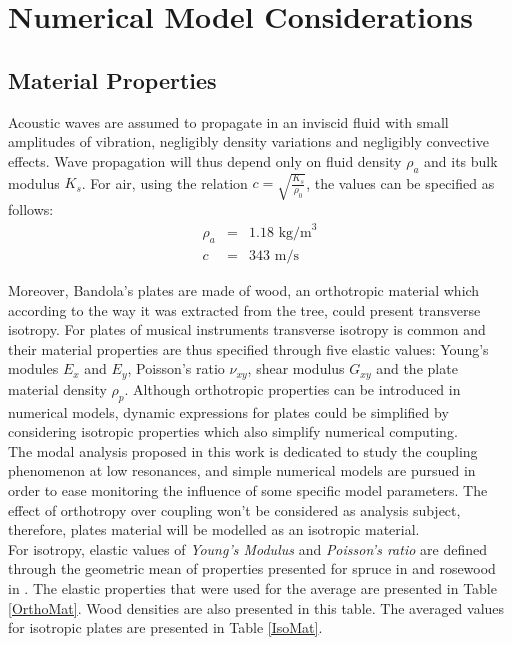 \section{Numerical Model Considerations}

\subsection{Material Properties}

Acoustic waves are assumed to propagate in an inviscid fluid with small amplitudes of vibration, negligibly density variations and negligibly convective effects. Wave propagation will thus depend only on fluid density $\rho_a$ and its bulk modulus $K_s$. For air, using the relation $c= \sqrt{\frac{K_s}{\rho_0}}$, the values can be specified as follows:
\begin{eqnarray*}
\rho_a & = & 1.18 \text{ kg/m}^3\\
c & = & 343 \text{ m/s} 
\end{eqnarray*}

Moreover, Bandola's plates are made of wood, an orthotropic material which according to the way it was extracted from the tree, could present transverse isotropy. For plates of musical instruments transverse isotropy is common and their material properties are thus specified through five elastic values: Young's modules $E_x$ and $E_y$, Poisson's ratio $\nu_{xy}$, shear modulus $G_{xy}$ and the plate material density $\rho_p$. Although orthotropic properties can be introduced in numerical models, dynamic expressions for plates could be simplified by considering isotropic properties which also simplify numerical computing.\\

The modal analysis proposed in this work is dedicated to study the coupling phenomenon at low resonances, and simple numerical models are pursued in order to ease monitoring the influence of some specific model parameters. The effect of orthotropy over coupling won't be considered as analysis subject, therefore, plates material will be modelled as an isotropic material.\\

For isotropy, elastic values of \textit{Young's Modulus} and \textit{Poisson's ratio} are defined through the geometric mean of properties presented for spruce in \cite{J.Torres1} and rosewood in \cite{Elejabarrieta}. The elastic properties that were used for the average are presented in Table \ref{OrthoMat}. Wood densities are also presented in this table. The averaged values for isotropic plates are presented in Table \ref{IsoMat}.  


